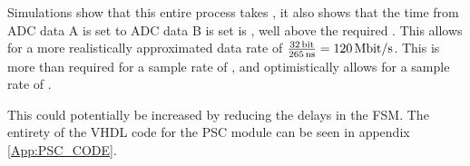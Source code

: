 Simulations show that this entire process takes , it also shows that the time from ADC data A is set to ADC data B is set is , well above the required . This allows for a more realistically approximated data rate of $\frac{\SIQ{32}{\bit}}{\SIQ{265}{\nano\second}} = \SIQ{120}{\mega\bit/\second}$. This is more than required for a sample rate of , and optimistically allows for a sample rate of .

This could potentially be increased by reducing the delays in the FSM. The entirety of the VHDL code for the PSC module can be seen in appendix \ref{App:PSC_CODE}.